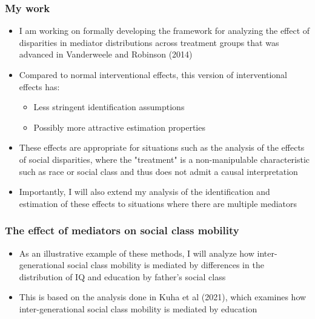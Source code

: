 \documentclass{beamer}
\begin{document}
\begin{frame}
\frametitle{My work}
\begin{itemize}
\item I am working on formally developing the framework for analyzing the effect of disparities in mediator distributions across treatment groups that was advanced in Vanderweele and Robinson (2014)
\item Compared to normal interventional effects, this version of interventional effects has:
\begin{itemize}
\item Less stringent identification assumptions 
\item Possibly more attractive estimation properties
\end{itemize}
\item These effects are appropriate for situations such as the analysis of the effects of social disparities, where the "treatment" is a non-manipulable characteristic such as race or social class and thus does not admit a causal interpretation
\item Importantly, I will also extend my analysis of the identification and estimation of these effects to situations where there are multiple mediators
\end{itemize}
\end{frame}

\begin{frame}
\frametitle{The effect of mediators on social class mobility}

\begin{itemize}
    \item As an illustrative example of these methods, I will analyze how inter-generational social class mobility is mediated by differences in the distribution of IQ and education by father's social class
    \item This is based on the analysis done in Kuha et al (2021), which examines how inter-generational social class mobility is mediated by education
\end{itemize}

\begin{figure}
\centering
{}
\end{figure}
\end{frame}
\end{document}
